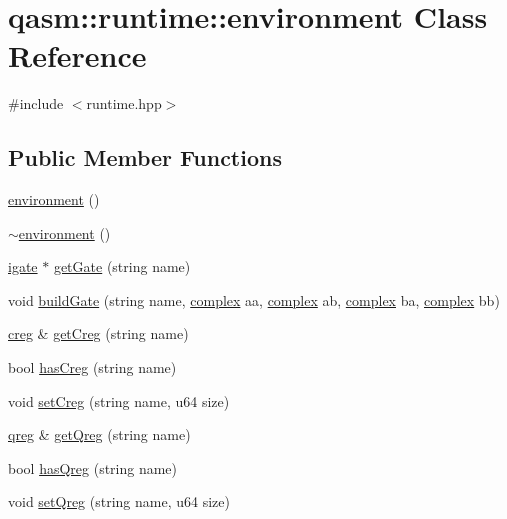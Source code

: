 \hypertarget{classqasm_1_1runtime_1_1environment}{}\section{qasm\+:\+:runtime\+:\+:environment Class Reference}
\label{classqasm_1_1runtime_1_1environment}


{\ttfamily \#include $<$runtime.\+hpp$>$}

\subsection*{Public Member Functions}
\begin{DoxyCompactItemize}
\item 
\hyperlink{classqasm_1_1runtime_1_1environment_af9ad7d4cd53f37a597c049a3bc08500f}{environment} ()
\item 
\hyperlink{classqasm_1_1runtime_1_1environment_aa71963228b400dc8dc874a460017e663}{$\sim$environment} ()
\item 
\hyperlink{classqlib_1_1quantum_1_1gates_1_1igate}{igate} $\ast$ \hyperlink{classqasm_1_1runtime_1_1environment_adb75f9df54d04d4f5d51c92093b5d466}{get\+Gate} (string name)
\item 
void \hyperlink{classqasm_1_1runtime_1_1environment_a6a71dc3d263c92394bc5e4c79973a556}{build\+Gate} (string name, \hyperlink{classqlib_1_1math_1_1complex}{complex} aa, \hyperlink{classqlib_1_1math_1_1complex}{complex} ab, \hyperlink{classqlib_1_1math_1_1complex}{complex} ba, \hyperlink{classqlib_1_1math_1_1complex}{complex} bb)
\item 
\hyperlink{runtime_8hpp_a20cf870406c99de2d935e3a77b8b60da}{creg} \& \hyperlink{classqasm_1_1runtime_1_1environment_a78ac575d7245e21c65fb31e6585c38cc}{get\+Creg} (string name)
\item 
bool \hyperlink{classqasm_1_1runtime_1_1environment_a4cd69bebda4f5957e52168c91654f5f5}{has\+Creg} (string name)
\item 
void \hyperlink{classqasm_1_1runtime_1_1environment_a976c4f032feee9c47af587a0f6c759ae}{set\+Creg} (string name, u64 size)
\item 
\hyperlink{classqlib_1_1quantum_1_1qreg}{qreg} \& \hyperlink{classqasm_1_1runtime_1_1environment_ae4f47f020b8baf4f94165345f26a6dca}{get\+Qreg} (string name)
\item 
bool \hyperlink{classqasm_1_1runtime_1_1environment_a77a8db656f3c5b5a2fcdde9a205deee5}{has\+Qreg} (string name)
\item 
void \hyperlink{classqasm_1_1runtime_1_1environment_acd773cf48993b56c9f6b6b353a5a5e6a}{set\+Qreg} (string name, u64 size)
\end{DoxyCompactItemize}
